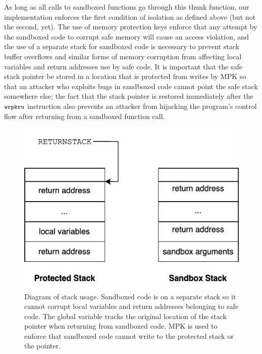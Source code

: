 \bigskip
As long as all calls to sandboxed functions go through this thunk function, our implementation
enforces the first condition of isolation as defined above (but not the second, yet). The use of
memory protection keys enforce that any attempt by the sandboxed code to corrupt safe memory will
cause an access violation, and the use of a separate stack for sandboxed code is necessary to
prevent stack buffer overflows and similar forms of memory corruption from affecting local variables
and return addresses use by safe code. It is important that the safe stack pointer be stored in a
location that is protected from writes by MPK so that an attacker who exploits bugs in sandboxed
code cannot point the safe stack somewhere else; the fact that the stack pointer is restored
immediately after the $\cc{wrpkru}$ instruction also prevents an attacker from hijacking the
program's control flow after returning from a sandboxed function call.

\begin{figure}[!ht]
    \centering
    \includegraphics{fig/stack}
    \caption[Diagram of stack usage]{Diagram of stack usage. Sandboxed code is on a separate stack
    so it cannot corrupt local variables and return addresses belonging to safe code. The
     global variable tracks the original location of the stack pointer when
    returning from sandboxed code. MPK is used to enforce that sandboxed code cannot write to the
    protected stack or the  pointer.}
    \label{f:stack}
\end{figure}


